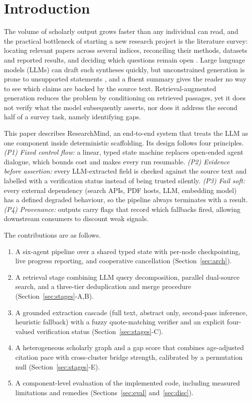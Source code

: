 \documentclass[conference]{IEEEtran}
\newcommand{\RM}{ResearchMind}
\begin{document}
\section{Introduction}
\label{sec:intro}
The volume of scholarly output grows faster than any individual can read, and the practical bottleneck of starting a new research project is the literature survey: locating relevant papers across several indices, reconciling their methods, datasets and reported results, and deciding which questions remain open \cite{fortunato2018science}. Large language models (LLMs) can draft such syntheses quickly, but unconstrained generation is prone to unsupported statements \cite{ji2023hallucination}, and a fluent summary gives the reader no way to see which claims are backed by the source text. Retrieval-augmented generation \cite{lewis2020rag} reduces the problem by conditioning on retrieved passages, yet it does not verify what the model subsequently asserts, nor does it address the second half of a survey task, namely identifying gaps.

This paper describes \RM, an end-to-end system that treats the LLM as one component inside deterministic scaffolding. Its design follows four principles. \emph{(P1) Fixed control flow:} a linear, typed state machine replaces open-ended agent dialogue, which bounds cost and makes every run resumable. \emph{(P2) Evidence before assertion:} every LLM-extracted field is checked against the source text and labelled with a verification status instead of being trusted silently. \emph{(P3) Fail soft:} every external dependency (search APIs, PDF hosts, LLM, embedding model) has a defined degraded behaviour, so the pipeline always terminates with a result. \emph{(P4) Provenance:} outputs carry flags that record which fallbacks fired, allowing downstream consumers to discount weak signals.

The contributions are as follows.
\begin{enumerate}
\item A six-agent pipeline over a shared typed state with per-node checkpointing, live progress reporting, and cooperative cancellation (Section~\ref{sec:arch}).
\item A retrieval stage combining LLM query decomposition, parallel dual-source search, and a three-tier deduplication and merge procedure (Section~\ref{sec:stages}-A,B).
\item A grounded extraction cascade (full text, abstract only, second-pass inference, heuristic fallback) with a fuzzy quote-matching verifier and an explicit four-valued verification status (Section~\ref{sec:stages}-C).
\item A heterogeneous scholarly graph and a gap score that combines age-adjusted citation pace with cross-cluster bridge strength, calibrated by a permutation null (Section~\ref{sec:stages}-E).
\item A component-level evaluation of the implemented code, including measured limitations and remedies (Sections~\ref{sec:eval} and~\ref{sec:disc}).
\end{enumerate}
\end{document}
